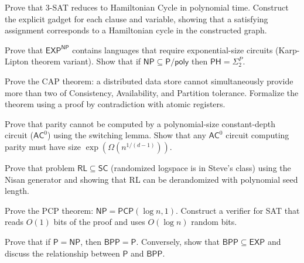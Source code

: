 \documentclass[12pt,a4paper]{exam}
\begin{document}
\begin{questions}
\vspace{0.3cm}

\question[2]
Prove that 3-SAT reduces to Hamiltonian Cycle in polynomial time. Construct the explicit gadget for each clause and variable, showing that a satisfying assignment corresponds to a Hamiltonian cycle in the constructed graph.

\vspace{0.3cm}

\question[3]
Prove that $\mathsf{EXP}^{\mathsf{NP}}$ contains languages that require exponential-size circuits (Karp-Lipton theorem variant). Show that if $\mathsf{NP} \subseteq \mathsf{P}/\mathsf{poly}$ then $\mathsf{PH} = \Sigma_2^P$.

\vspace{0.3cm}

\question[5]
Prove the CAP theorem: a distributed data store cannot simultaneously provide more than two of Consistency, Availability, and Partition tolerance. Formalize the theorem using a proof by contradiction with atomic registers.

\vspace{0.3cm}

\question[3]
Prove that parity cannot be computed by a polynomial-size constant-depth circuit ($\mathsf{AC}^0$) using the switching lemma. Show that any $\mathsf{AC}^0$ circuit computing parity must have size $\exp(\Omega(n^{1/(d-1)}))$.

\vspace{0.3cm}

\question[3]
Prove that problem $\mathsf{RL} \subseteq \mathsf{SC}$ (randomized logspace is in Steve's class) using the Nisan generator and showing that RL can be derandomized with polynomial seed length.

\vspace{0.3cm}

\question[5]
Prove the PCP theorem: $\mathsf{NP} = \mathsf{PCP}(\log n, 1)$. Construct a verifier for SAT that reads $O(1)$ bits of the proof and uses $O(\log n)$ random bits.

\vspace{0.3cm}

\question[5]
Prove that if $\mathsf{P} = \mathsf{NP}$, then $\mathsf{BPP} = \mathsf{P}$. Conversely, show that $\mathsf{BPP} \subseteq \mathsf{EXP}$ and discuss the relationship between $\mathsf{P}$ and $\mathsf{BPP}$.

\vspace{0.3cm}


\end{questions}
\end{document}
